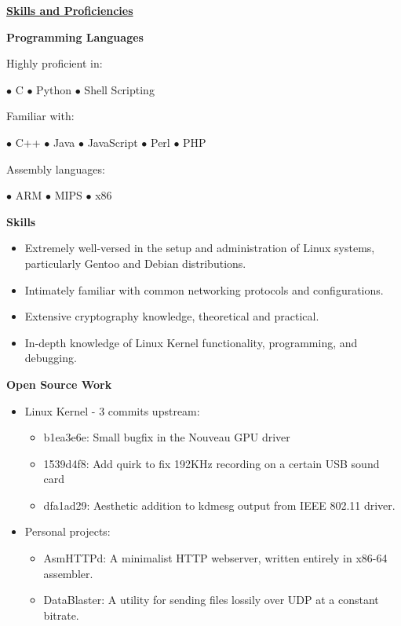 \documentclass[11pt]{article}
\begin{document}
\noindent
\hrulefill

\centerline{\underline{\bf Skills and Proficiencies}}

\begin{multicols}{2}

\centerline{\bf Programming Languages}
\bigskip
\noindent Highly proficient in:\\
\centerline{\hfill $\bullet$ C \hfill $\bullet$ Python \hfill $\bullet$ Shell Scripting \hfill}
\noindent Familiar with:\\
\centerline{\hfill $\bullet$ C++ \hfill $\bullet$ Java \hfill $\bullet$ JavaScript \hfill $\bullet$ Perl \hfill $\bullet$ PHP \hfill}
\noindent Assembly languages:\\
\centerline{\hfill $\bullet$ ARM \hfill $\bullet$ MIPS \hfill $\bullet$ x86 \hfill}

\bigskip

\centerline{\bf Skills}
\begin{itemize}[leftmargin=*]
\itemsep 0em
	\item Extremely well-versed in the setup and administration of Linux systems, particularly Gentoo and Debian distributions.
	\item Intimately familiar with common networking protocols and configurations.
	\item Extensive cryptography knowledge, theoretical and practical.
	\item In-depth knowledge of Linux Kernel functionality, programming, and debugging.
\end{itemize}

\columnbreak

\centerline{\bf Open Source Work}
\begin{itemize}[leftmargin=*]
\itemsep 0em
	\item Linux Kernel - 3 commits upstream:
	\begin{itemize}
	\itemsep 0em
		\item b1ea3e6e: Small bugfix in the Nouveau GPU driver
		\item 1539d4f8: Add quirk to fix 192KHz recording on a certain USB sound card
		\item dfa1ad29: Aesthetic addition to kdmesg output from IEEE 802.11 driver.
	\end{itemize}
	\item Personal projects:
	\begin{itemize}
	\itemsep 0em
		\item AsmHTTPd: A minimalist HTTP webserver, written entirely in x86-64 assembler.
		\item DataBlaster: A utility for sending files lossily over UDP at a constant bitrate.
	\end{itemize}
\end{itemize}

\end{multicols}
\end{document}
